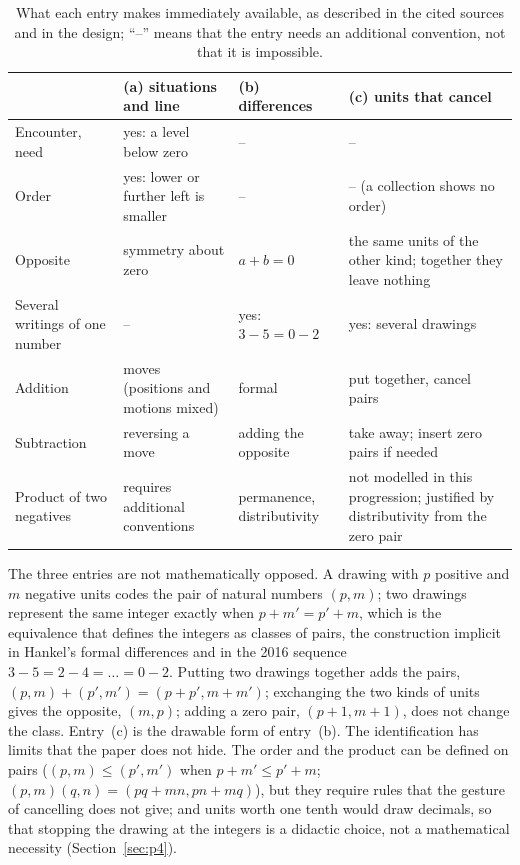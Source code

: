 \documentclass[11pt,a4paper]{article}
\theoremstyle{definition}
\begin{document}
\begin{table}[htbp]
\centering\small
\caption{What each entry makes immediately available, as described in the cited sources and in the design; ``--'' means that the entry needs an additional convention, not that it is impossible.}
\label{tab:entries}
\begin{tabularx}{\textwidth}{>{\raggedright\arraybackslash}p{3.0cm}XXX}
\toprule
 & (a) situations and line & (b) differences & (c) units that cancel \\
\midrule
Encounter, need & yes: a level below zero & -- & -- \\
Order & yes: lower or further left is smaller & -- & -- (a collection shows no order) \\
Opposite & symmetry about zero & $a+b=0$ & the same units of the other kind; together they leave nothing \\
Several writings of one number & -- & yes: $3-5=0-2$ & yes: several drawings \\
Addition & moves (positions and motions mixed) & formal & put together, cancel pairs \\
Subtraction & reversing a move & adding the opposite & take away; insert zero pairs if needed \\
Product of two negatives & requires additional conventions & permanence, distributivity & not modelled in this progression; justified by distributivity from the zero pair \\
\bottomrule
\end{tabularx}
\end{table}

The three entries are not mathematically opposed. A drawing with $p$ positive and $m$ negative units codes the pair of natural numbers $(p,m)$; two drawings represent the same integer exactly when $p+m'=p'+m$, which is the equivalence that defines the integers as classes of pairs, the construction implicit in Hankel's formal differences and in the 2016 sequence $3-5=2-4=\ldots=0-2$. Putting two drawings together adds the pairs, $(p,m)+(p',m')=(p+p',m+m')$; exchanging the two kinds of units gives the opposite, $(m,p)$; adding a zero pair, $(p+1,m+1)$, does not change the class. Entry~(c) is the drawable form of entry~(b). The identification has limits that the paper does not hide. The order and the product can be defined on pairs ($(p,m)\le(p',m')$ when $p+m'\le p'+m$; $(p,m)(q,n)=(pq+mn,pn+mq)$), but they require rules that the gesture of cancelling does not give; and units worth one tenth would draw decimals, so that stopping the drawing at the integers is a didactic choice, not a mathematical necessity (Section~\ref{sec:p4}).
\end{document}
